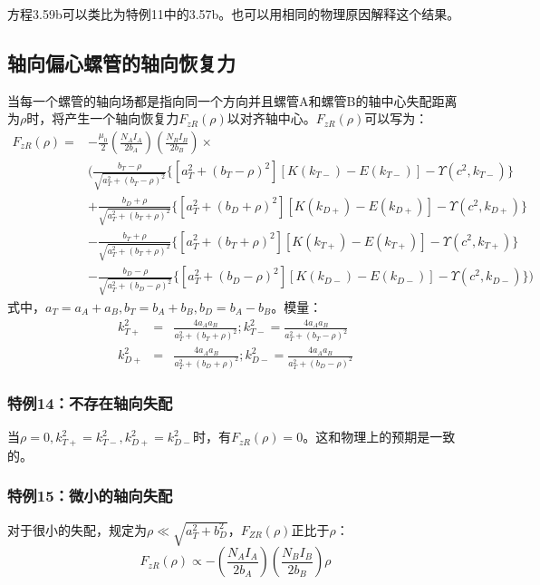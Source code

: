 方程3.59b可以类比为特例11中的3.57b。也可以用相同的物理原因解释这个结果。

\subsection{轴向偏心螺管的轴向恢复力}
当每一个螺管的轴向场都是指向同一个方向并且螺管A和螺管B的轴中心失配距离为$\rho$时，将产生一个轴向恢复力$F_{zR}(\rho)$以对齐轴中心。$F_{zR}(\rho)$可以写为：
\begin{equation}
\begin{split}
F_{zR}(\rho)=&-\frac{\mu_0}{2}(\frac{N_AI_A}{2b_A})(\frac{N_BI_B}{2b_B})\times\\
&(\frac{b_T-\rho}{\sqrt{a_T^2+(b_T-\rho)^2}}\{[a_T^2+(b_T-\rho)^2][K(k_{T-})-E(k_{T-})]-\Upsilon(c^2,k_{T-})\}\\
&+\frac{b_D+\rho}{\sqrt{a_T^2+(b_T+\rho)^2}}\{[a_T^2+(b_D+\rho)^2][K(k_{D+})-E(k_{D+})]-\Upsilon(c^2,k_{D+})\}\\
&-\frac{b_T+\rho}{\sqrt{a_T^2+(b_T+\rho)^2}}\{[a_T^2+(b_T+\rho)^2][K(k_{T+})-E(k_{T+})]-\Upsilon(c^2,k_{T+})\}\\
&-\frac{b_D-\rho}{\sqrt{a_T^2+(b_D-\rho)^2}}\{[a_T^2+(b_D-\rho)^2][K(k_{D-})-E(k_{D-})]-\Upsilon(c^2,k_{D-})\})
\end{split}
\end{equation}
式中，$a_T=a_A+a_B, b_T=b_A+b_B, b_D=b_A−b_B$。模量：
\begin{eqnarray}
k_{T+}^2&=&\frac{4a_Aa_B}{a_T^2+(b_T+\rho)^2}; k_{T-}^2=\frac{4a_Aa_B}{a_T^2+(b_T-\rho)^2}\\ \nonumber
k_{D+}^2&=&\frac{4a_Aa_B}{a_T^2+(b_D+\rho)^2};  k_{D-}^2=\frac{4a_Aa_B}{a_T^2+(b_D-\rho)^2}
\end{eqnarray}

\subsubsection{特例14：不存在轴向失配}
当$\rho=0, k_{T+}^2=k_{T-}^2, k_{D+}^2=k_{D-}^2$时，有$F_{zR}(\rho)=0$。这和物理上的预期是一致的。

\subsubsection{特例15：微小的轴向失配}
对于很小的失配，规定为$\rho\ll \sqrt{a_T^2+b_D^2}$，$F_{ZR}(\rho)$正比于$\rho$：
\begin{equation}
F_{zR}(\rho)\propto-(\frac{N_AI_A}{2b_A})(\frac{N_BI_B}{2b_B})\rho
\end{equation}

